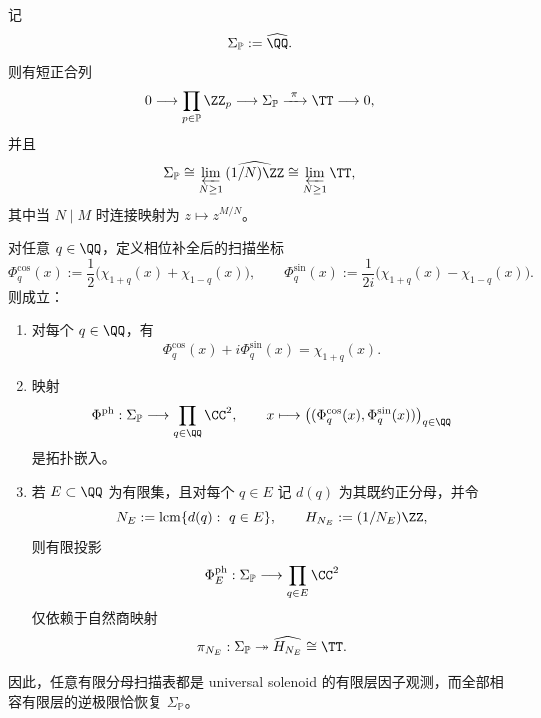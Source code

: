 \begin{proposition}\label{prop:xi-time-part62d-universal-solenoid-phase-completed-scan}
记
\[
\Sigma_{\mathbb P}:=\widehat{\QQ}.
\]
则有短正合列
\[
0\longrightarrow \prod_{p\in\mathbb P}\ZZ_p
\longrightarrow \Sigma_{\mathbb P}
\xrightarrow{\ \pi\ }
\TT
\longrightarrow 0,
\]
并且
\[
\Sigma_{\mathbb P}
\cong
\varprojlim_{N\ge 1}\widehat{(1/N)\ZZ}
\cong
\varprojlim_{N\ge 1}\TT,
\]
其中当 \(N\mid M\) 时连接映射为 \(z\mapsto z^{M/N}\)。

对任意 \(q\in\QQ\)，定义相位补全后的扫描坐标
\[
\Phi_q^{\cos}(x):=\frac12\bigl(\chi_{1+q}(x)+\chi_{1-q}(x)\bigr),
\qquad
\Phi_q^{\sin}(x):=\frac{1}{2i}\bigl(\chi_{1+q}(x)-\chi_{1-q}(x)\bigr).
\]
则成立：
\begin{enumerate}
  \item 对每个 \(q\in\QQ\)，有
  \[
  \Phi_q^{\cos}(x)+i\Phi_q^{\sin}(x)=\chi_{1+q}(x).
  \]
  \item 映射
  \[
  \Phi^{\mathrm{ph}}:\Sigma_{\mathbb P}\longrightarrow \prod_{q\in\QQ}\CC^2,
  \qquad
  x\longmapsto \bigl((\Phi_q^{\cos}(x),\Phi_q^{\sin}(x))\bigr)_{q\in\QQ}
  \]
  是拓扑嵌入。
  \item 若 \(E\subset\QQ\) 为有限集，且对每个 \(q\in E\) 记 \(d(q)\) 为其既约正分母，并令
  \[
  N_E:=\operatorname{lcm}\{d(q):\ q\in E\},
  \qquad
  H_{N_E}:=(1/N_E)\ZZ,
  \]
  则有限投影
  \[
  \Phi_E^{\mathrm{ph}}:\Sigma_{\mathbb P}\longrightarrow \prod_{q\in E}\CC^2
  \]
  仅依赖于自然商映射
  \[
  \pi_{N_E}:\Sigma_{\mathbb P}\twoheadrightarrow \widehat{H_{N_E}}\cong \TT.
  \]
\end{enumerate}
因此，任意有限分母扫描表都是 universal solenoid 的有限层因子观测，而全部相容有限层的逆极限恰恢复 \(\Sigma_{\mathbb P}\)。
\end{proposition}
